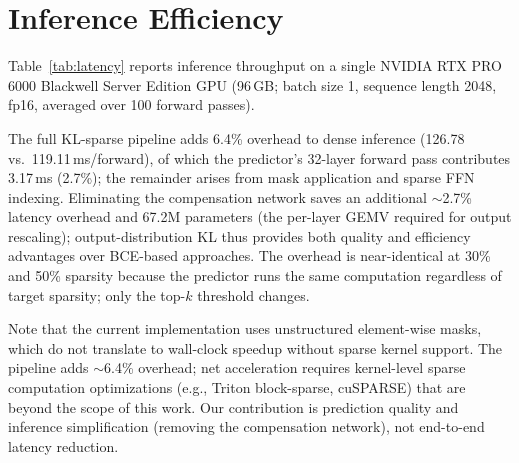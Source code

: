 \appendix

\section{Inference Efficiency}
\label{app:latency}

Table~\ref{tab:latency} reports inference throughput on a single NVIDIA RTX PRO 6000 Blackwell Server Edition GPU (96\,GB; batch size 1, sequence length 2048, fp16, averaged over 100 forward passes).

\begin{table}[h]
\centering
\caption{Inference latency on LLaMA-3.1-8B (RTX PRO 6000 Blackwell, batch=1, seq=2048, fp16, 100 forward passes). Overhead is relative to dense inference.}
\label{tab:latency}
\end{table}

The full KL-sparse pipeline adds 6.4\% overhead to dense inference (126.78 vs.\ 119.11\,ms/forward), of which the predictor's 32-layer forward pass contributes 3.17\,ms (2.7\%); the remainder arises from mask application and sparse FFN indexing.
Eliminating the compensation network saves an additional $\sim$2.7\% latency overhead and 67.2M parameters (the per-layer GEMV required for output rescaling); output-distribution KL thus provides both quality and efficiency advantages over BCE-based approaches.
The overhead is near-identical at 30\% and 50\% sparsity because the predictor runs the same computation regardless of target sparsity; only the top-$k$ threshold changes.

Note that the current implementation uses unstructured element-wise masks, which do not translate to wall-clock speedup without sparse kernel support.
The pipeline adds $\sim$6.4\% overhead; net acceleration requires kernel-level sparse computation optimizations (e.g., Triton block-sparse, cuSPARSE) that are beyond the scope of this work.
Our contribution is prediction quality and inference simplification (removing the compensation network), not end-to-end latency reduction.


